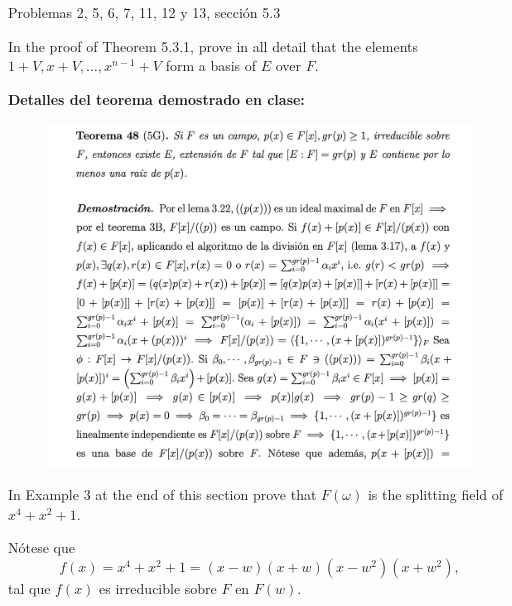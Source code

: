 




Problemas 2, 5, 6, 7, 11, 12 y 13, sección 5.3


\begin{problema}[Problema 2]

In the proof of Theorem 5.3.1, prove in all detail that the elements $1+V, x+V, \ldots, x^{n-1}+V$ form a basis of $E$ over $F$.
\begin{dem}
    \textbf{Detalles del teorema demostrado en clase:}
    \begin{figure}[H]
        \centering
        \includegraphics[scale=0.5]{Problemas/dem1.png}
    \end{figure}
\end{dem}
\end{problema}

\begin{problema}[Problema 5]
    In Example 3 at the end of this section prove that $F(\omega)$ is the splitting field of $x^4+x^2+1$.
    \begin{dem}
        Nótese que 
        $$f(x)=x^4+x^2+1 = (x-w)(x+w)(x-w^2)(x+w^2),$$
        tal que $f(x)$ es irreducible sobre $F$ en $F(w)$.
    \end{dem}

\end{problema}

